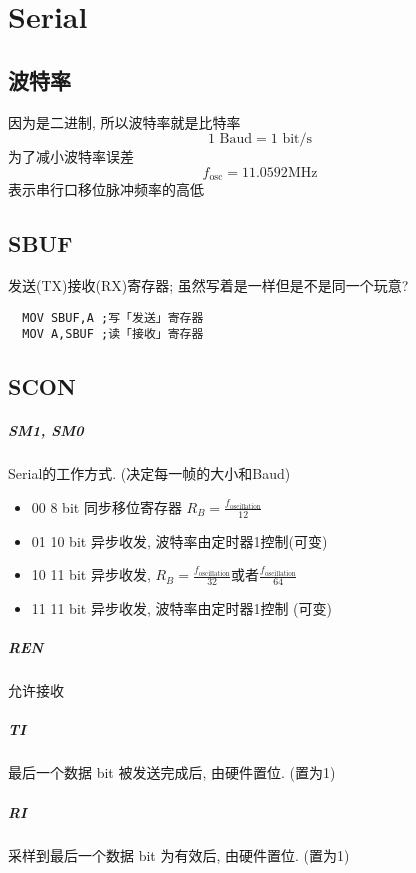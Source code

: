 \documentclass[a4paper]{report}
\begin{document}
\chapter{Serial}
\section{波特率}
因为是二进制, 所以波特率就是比特率
\begin{equation}
  1 \text{ Baud}=1\text{ bit/s}
\end{equation}
为了减小波特率误差
\begin{equation}
  f_\text{osc}=11.0592\text{MHz}
\end{equation}
表示串行口移位脉冲频率的高低
\section{SBUF}
发送(TX)接收(RX)寄存器; 虽然写着是一样但是不是同一个玩意? 
\begin{verbatim}
  MOV SBUF,A ;写「发送」寄存器
  MOV A,SBUF ;读「接收」寄存器
\end{verbatim}
\section{SCON}
\paragraph{SM1, SM0} Serial的工作方式. (决定每一帧的大小和Baud)
\begin{itemize}
  \item 00 8 bit 同步移位寄存器 $R_B=\frac{f_\text{oscillation}}{12}$
  \item 01 10 bit 异步收发, 波特率由定时器1控制(可变)
  \item 10 11 bit 异步收发, $R_B=\frac{f_\text{oscillation}}{32}$或者$\frac{f_\text{oscillation}}{64}$
  \item 11 11 bit 异步收发, 波特率由定时器1控制 (可变)
\end{itemize}
\paragraph{REN} 允许接收
\paragraph{TI} 最后一个数据 bit 被发送完成后, 由硬件置位. (置为1)
\paragraph{RI} 采样到最后一个数据 bit 为有效后, 由硬件置位. (置为1)
\end{document}
